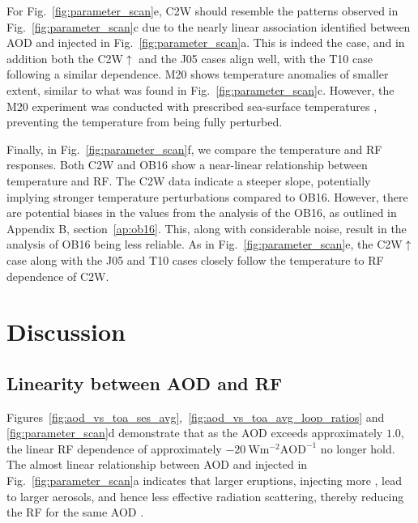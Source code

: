 \documentclass[draft]{agujournal2019}
\newcommand{\iso}[1][i]{{#1}njected \ce{SO2}}
\newcommand{\cwsn}{C2W\(\uparrow\)}
\begin{document}
For Fig.~\ref{fig:parameter_scan}e, C2W should resemble the patterns observed in
Fig.~\ref{fig:parameter_scan}c due to the nearly linear association identified between
AOD and \iso{} in Fig.~\ref{fig:parameter_scan}a. This is indeed the case, and in
addition both the \cwsn{} and the J05 cases align well, with the T10
case following a similar dependence. M20 shows temperature anomalies of smaller
extent, similar to what was found in Fig.~\ref{fig:parameter_scan}c. However, the
M20 experiment was conducted with prescribed sea-surface temperatures
\cite{marshall2020}, preventing the temperature from being fully perturbed.

Finally, in Fig.~\ref{fig:parameter_scan}f, we compare the temperature and RF
responses. Both C2W and OB16 show a near-linear relationship between
temperature and RF. The C2W data indicate a steeper slope, potentially
implying stronger temperature perturbations compared to OB16. However, there are
potential biases in the values from the analysis of the OB16, as outlined in
Appendix B, section~\ref{ap:ob16}. This, along with considerable noise, result in the
analysis of OB16 being less reliable. As in Fig.~\ref{fig:parameter_scan}e, the
\cwsn{} case along with the J05 and T10 cases closely follow the
temperature to RF dependence of C2W.

\section{Discussion}\label{sec:discussion}


\subsection{Linearity between AOD and RF}

Figures~\ref{fig:aod_vs_toa_ses_avg},~\ref{fig:aod_vs_toa_avg_loop_ratios} and
\ref{fig:parameter_scan}d demonstrate that as the AOD exceeds approximately
\(1.0\), the linear RF dependence of approximately
\(\SI{-20}{\watt\metre^{-2}\mathrm{AOD}^{-1}}\) no longer hold. The almost linear
relationship between AOD and \iso{} in Fig.~\ref{fig:parameter_scan}a indicates
that larger eruptions, injecting more , lead to larger aerosols, and hence less
effective radiation scattering, thereby reducing the RF for the same AOD
\cite{english2013, timmreck2010, timmreck2018}.
\end{document}
